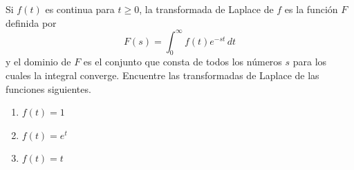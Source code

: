 \item Si $f(t)$ es continua para $t \ge 0$, la transformada de Laplace de $f$ es la función $F$ definida por
    \[ F(s) = \int_{0}^{\infty} f(t) e^{-st} \, dt \]
    y el dominio de $F$ es el conjunto que consta de todos los números $s$ para los cuales la integral converge. Encuentre las transformadas de Laplace de las funciones siguientes.
    \begin{enumerate}
        \item[(a)] $f(t) = 1$
        \item[(b)] $f(t) = e^t$
        \item[(c)] $f(t) = t$
    \end{enumerate}

